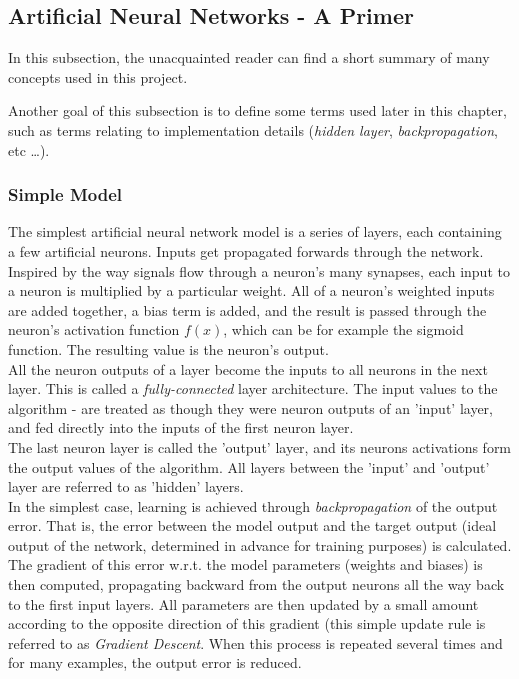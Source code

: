 \subsection{Artificial Neural Networks - A Primer}
\label{subsec:primer}

In this subsection, the unacquainted reader can find a short summary of many concepts used in this project.

Another goal of this subsection is to define some terms used later in this chapter, such as terms relating to implementation details (\textit{hidden layer}, \textit{backpropagation}, etc \ldots).

\subsubsection{Simple Model}
\label{subsubsec:simple-model}

The simplest artificial neural network model is a series of layers, each containing a few artificial neurons. Inputs get propagated forwards through the network. Inspired by the way signals flow through a neuron's many synapses, each input to a neuron is multiplied by a particular weight. All of a neuron's weighted inputs are added together, a bias term is added, and the result is passed through the neuron's activation function $f(x)$, which can be for example the sigmoid function. The resulting value is the neuron's output.\\

All the neuron outputs of a layer become the inputs to all neurons in the next layer. This is called a \textit{fully-connected} layer architecture. The input values to the algorithm - are treated as though they were neuron outputs of an 'input' layer, and fed directly into the inputs of the first neuron layer.\\

The last neuron layer is called the 'output' layer, and its neurons activations form the output values of the algorithm. All layers between the 'input' and 'output' layer are referred to as 'hidden' layers.\\

In the simplest case, learning is achieved through \textit{backpropagation} of the output error. That is, the error between the model output and the target output (ideal output of the network, determined in advance for training purposes) is calculated. The gradient of this error w.r.t. the model parameters (weights and biases) is then computed, propagating backward from the output neurons all the way back to the first input layers. All parameters are then updated by a small amount according to the opposite direction of this gradient (this simple update rule is referred to as \textit{Gradient Descent}. When this process is repeated several times and for many examples, the output error is reduced.\\

